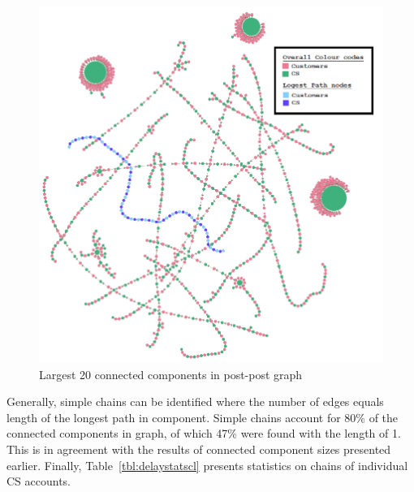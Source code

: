\documentclass[sigconf]{acmart}
\begin{document}
{\begin{figure}[htb]
\centering
\includegraphics[width=\columnwidth]{images/20ccpostpostgraph.png}
\caption{Largest 20 connected components in post-post graph}
\label{fig:20ccpostpostgraph}
\end{figure}

Generally, simple chains can be identified where the number of edges
equals length of the longest path in component. Simple chains account
for 80\% of the connected components in graph, of which 47\% were
found with the length of 1. This is in agreement with the results of
connected component sizes presented earlier. Finally,
Table~\ref{tbl:delaystatscl} presents statistics on chains of
individual CS accounts.


}
\end{document}
